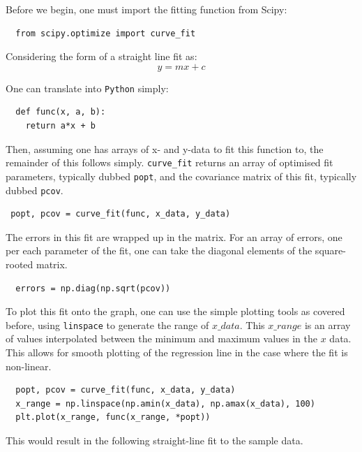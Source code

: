 \documentclass{article}
\begin{document}
Before we begin, one must import the fitting function from Scipy:

\begin{lstlisting}
  from scipy.optimize import curve_fit
\end{lstlisting}

Considering the form of a straight line fit as:
\begin{equation}
  \label{eq:slf}
  y = mx + c
\end{equation}

One can translate into \texttt{Python} simply:
\begin{lstlisting}
  def func(x, a, b):
    return a*x + b
\end{lstlisting}

Then, assuming one has arrays of x- and y-data to fit this function
to, the remainder of this follows simply. \texttt{curve\_fit} returns
an array of optimised fit parameters, typically dubbed \texttt{popt},
and the covariance matrix of this fit, typically dubbed \texttt{pcov}.

\begin{lstlisting}
 popt, pcov = curve_fit(func, x_data, y_data) 
\end{lstlisting}

The errors in this fit are wrapped up in the matrix. For an array of
errors, one per each parameter of the fit, one can take the diagonal
elements of the square-rooted matrix.

\begin{lstlisting}
  errors = np.diag(np.sqrt(pcov))
\end{lstlisting}

To plot this fit onto the graph, one can use the simple plotting tools
as covered before, using \texttt{linspace} to generate the range of
$x\_data$. This $x\_range$ is an array of values interpolated between
the minimum and maximum values in the $x$ data. This allows for smooth
plotting of the regression line in the case where the fit is
non-linear.

\begin{lstlisting}  
  popt, pcov = curve_fit(func, x_data, y_data)
  x_range = np.linspace(np.amin(x_data), np.amax(x_data), 100)
  plt.plot(x_range, func(x_range, *popt))
\end{lstlisting}

This would result in the following straight-line fit to the sample
data.
\end{document}
